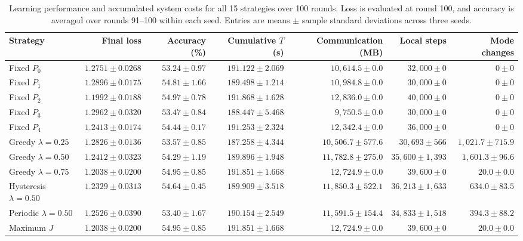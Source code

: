 \documentclass[5p,times]{elsarticle}
\theoremstyle{plain}
\theoremstyle{definition}
\theoremstyle{remark}
\begin{document}
	\begin{table}[t]
		\centering
		\caption{Learning performance and accumulated system costs for
				all 15 strategies over 100 rounds. Loss is evaluated at round
				100, and accuracy is averaged over rounds 91--100 within each
				seed. Entries are means $\pm$ sample standard deviations
				across three seeds.}
		\label{tab:final_tradeoffs}
		\scriptsize
		\setlength{\tabcolsep}{2.2pt}
		\begin{tabular}{lrrrrrr}
			\toprule
			\textbf{Strategy} & \textbf{Final loss} & \textbf{Accuracy (\%)} &
			\textbf{Cumulative $T$ (s)} & \textbf{Communication (MB)} &
			\textbf{Local steps} & \textbf{Mode changes} \\
			\midrule
			Fixed $P_0$ & $1.2751\pm0.0268$ & $53.24\pm0.97$ & $191.122\pm2.069$ & $10{,}614.5\pm0.0$ & $32{,}000\pm0$ & $0\pm0$ \\
			Fixed $P_1$ & $1.2896\pm0.0175$ & $54.81\pm1.66$ & $189.498\pm1.214$ & $10{,}984.8\pm0.0$ & $30{,}000\pm0$ & $0\pm0$ \\
			Fixed $P_2$ & $1.1992\pm0.0188$ & $54.97\pm0.78$ & $191.868\pm1.628$ & $12{,}836.0\pm0.0$ & $40{,}000\pm0$ & $0\pm0$ \\
			Fixed $P_3$ & $1.2962\pm0.0320$ & $53.47\pm0.84$ & $188.447\pm5.468$ & $9{,}750.5\pm0.0$ & $30{,}000\pm0$ & $0\pm0$ \\
			Fixed $P_4$ & $1.2413\pm0.0174$ & $54.44\pm0.17$ & $191.253\pm2.324$ & $12{,}342.4\pm0.0$ & $36{,}000\pm0$ & $0\pm0$ \\
			\midrule
			Greedy $\lambda=0.25$ & $1.2826\pm0.0136$ & $53.57\pm0.85$ & $187.258\pm4.344$ & $10{,}506.7\pm577.6$ & $30{,}693\pm566$ & $1{,}021.7\pm715.9$ \\
			Greedy $\lambda=0.50$ & $1.2412\pm0.0323$ & $54.29\pm1.19$ & $189.896\pm1.948$ & $11{,}782.8\pm275.0$ & $35{,}600\pm1{,}393$ & $1{,}601.3\pm96.6$ \\
			Greedy $\lambda=0.75$ & $1.2038\pm0.0200$ & $54.95\pm0.85$ & $191.851\pm1.668$ & $12{,}724.9\pm0.0$ & $39{,}600\pm0$ & $20.0\pm0.0$ \\
			Hysteresis $\lambda=0.50$ & $1.2329\pm0.0313$ & $54.64\pm0.45$ & $189.909\pm3.518$ & $11{,}850.3\pm522.1$ & $36{,}213\pm1{,}633$ & $634.0\pm83.5$ \\
			Periodic $\lambda=0.50$ & $1.2526\pm0.0390$ & $53.40\pm1.67$ & $190.154\pm2.549$ & $11{,}591.5\pm154.4$ & $34{,}833\pm1{,}518$ & $394.3\pm88.2$ \\
			Maximum $J$ & $1.2038\pm0.0200$ & $54.95\pm0.85$ & $191.851\pm1.668$ & $12{,}724.9\pm0.0$ & $39{,}600\pm0$ & $20.0\pm0.0$ \\

\end{tabular}
\end{table}
\end{document}
